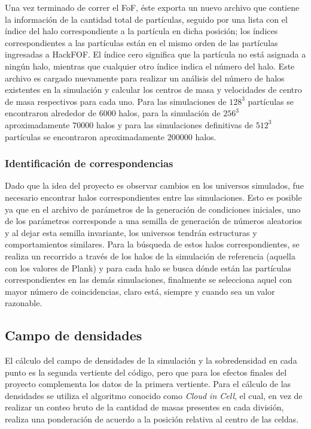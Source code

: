 Una vez terminado de correr el FoF, éste exporta un nuevo archivo que contiene la información de la cantidad total de partículas, seguido por una lista con el índice del halo correspondiente a la partícula en dicha posición; los índices correspondientes a las partículas están en el mismo orden de las partículas ingresadas a HackFOF. El índice cero significa que la partícula no está asignada a ningún halo, mientras que cualquier otro índice indica el número del halo. Este archivo es cargado nuevamente para realizar un análisis del número de halos existentes en la simulación y calcular los centros de masa y velocidades de centro de masa respectivos para cada uno. Para las simulaciones de $128^3$ partículas se encontraron alrededor de $6000$ halos, para la simulación de $256^3$ aproximadamente $70000$ halos y para las simulaciones definitivas de $512^3$ partículas se encontraron aproximadamente $200000$ halos.

\subsubsection{Identificación de correspondencias}

Dado que la idea del proyecto es observar cambios en los universos simulados, fue necesario encontrar halos correspondientes entre las simulaciones. Esto es posible ya que en el archivo de parámetros de la generación de condiciones iniciales, uno de los parámetros corresponde a una semilla de generación de números aleatorios y al dejar esta semilla invariante, los universos tendrán estructuras y comportamientos similares. Para la búsqueda de estos halos correspondientes, se realiza un recorrido a través de los halos de la simulación de referencia (aquella con los valores de Plank) y para cada halo se busca dónde están las partículas correspondientes en las demás simulaciones, finalmente se selecciona aquel con mayor número de coincidencias, claro está, siempre y cuando sea un valor razonable. 


\subsection{Campo de densidades}
\label{sub:CIC}
El cálculo del campo de densidades de la simulación y la sobredensidad en cada punto es la segunda vertiente del código, pero que para los efectos finales del proyecto complementa los datos de la primera vertiente. Para el cálculo de las densidades se utiliza el algoritmo conocido como \textit{Cloud in Cell}, el cual, en vez de realizar un conteo bruto de la cantidad de masas presentes en cada división, realiza una ponderación de acuerdo a la posición relativa al centro de las celdas. 

